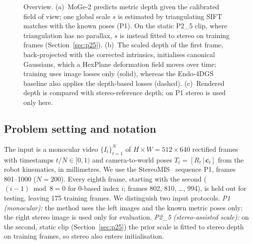 \documentclass[conference]{IEEEtran}
\begin{document}
\begin{figure}[t]
{}
\caption{Overview. (a)~MoGe-2 predicts metric depth given the calibrated field of view; one global scale $s$ is estimated by triangulating SIFT matches with the known poses (P1). On the static P2\_5 clip, where triangulation has no parallax, $s$ is instead fitted to stereo on training frames (Section~\ref{sec:p25}). (b)~The scaled depth of the first frame, back-projected with the corrected intrinsics, initialises canonical Gaussians, which a HexPlane deformation field moves over time; training uses image losses only (solid), whereas the Endo-4DGS baseline also applies the depth-based losses (dashed). (c)~Rendered depth is compared with stereo-reference depth; on P1 stereo is used only here.}
\label{fig:pipeline}
\end{figure}

\subsection{Problem setting and notation}
The input is a monocular video $\{I_t\}_{t=1}^{N}$ of $H{\times}W{=}512{\times}640$ rectified frames with timestamps $t/N\in[0,1)$ and camera-to-world poses $T_t=[R_t\,|\,\mathbf{c}_t]$ from the robot kinematics, in millimetres. We use the StereoMIS~\cite{hayoz2023stereomis} sequence P1, frames 801--1000 ($N{=}200$). Every eighth frame, starting with the second ($(i-1)\bmod 8=0$ for 0-based index $i$; frames 802, 810, \dots, 994), is held out for testing, leaving 175 training frames. We distinguish two input protocols. \emph{P1 (monocular):} the method uses the left images and the known metric poses only; the right stereo image is used only for evaluation. \emph{P2\_5 (stereo-assisted scale):} on the second, static clip (Section~\ref{sec:p25}) the prior scale is fitted to stereo depth on training frames, so stereo also enters initialisation.
\end{document}
